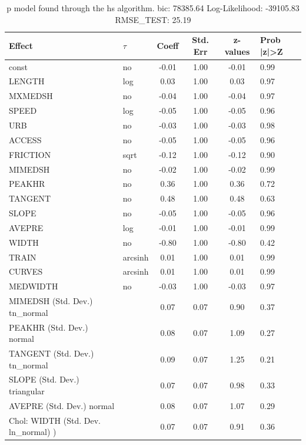 \begin{table}
	\caption{p model found through the hs algorithm. bic: 78385.64 Log-Likelihood: -39105.83 RMSE_TEST: 25.19}
	\begin{center}
		\begin{tabular}{|l|l|c|c|c|l|}
			\hline
			Effect & $\tau$ & Coeff & Std. Err & z-values & Prob |z|>Z \\
			\hline
			const & no & -0.01 & 1.00 & -0.01 & 0.99 \\
			\hline
			LENGTH & log & 0.03 & 1.00 & 0.03 & 0.97 \\
			\hline
			MXMEDSH & no & -0.04 & 1.00 & -0.04 & 0.97 \\
			\hline
			SPEED & log & -0.05 & 1.00 & -0.05 & 0.96 \\
			\hline
			URB & no & -0.03 & 1.00 & -0.03 & 0.98 \\
			\hline
			ACCESS & no & -0.05 & 1.00 & -0.05 & 0.96 \\
			\hline
			FRICTION & sqrt & -0.12 & 1.00 & -0.12 & 0.90 \\
			\hline
			MIMEDSH & no & -0.02 & 1.00 & -0.02 & 0.99 \\
			\hline
			PEAKHR & no & 0.36 & 1.00 & 0.36 & 0.72 \\
			\hline
			TANGENT & no & 0.48 & 1.00 & 0.48 & 0.63 \\
			\hline
			SLOPE & no & -0.05 & 1.00 & -0.05 & 0.96 \\
			\hline
			AVEPRE & log & -0.01 & 1.00 & -0.01 & 0.99 \\
			\hline
			WIDTH & no & -0.80 & 1.00 & -0.80 & 0.42 \\
			\hline
			TRAIN & arcsinh & 0.01 & 1.00 & 0.01 & 0.99 \\
			\hline
			CURVES & arcsinh & 0.01 & 1.00 & 0.01 & 0.99 \\
			\hline
			MEDWIDTH & no & -0.03 & 1.00 & -0.03 & 0.97 \\
			\hline
			MIMEDSH (Std. Dev.) tn_normal &  & 0.07 & 0.07 & 0.90 & 0.37 \\
			\hline
			PEAKHR (Std. Dev.) normal &  & 0.08 & 0.07 & 1.09 & 0.27 \\
			\hline
			TANGENT (Std. Dev.) tn_normal &  & 0.09 & 0.07 & 1.25 & 0.21 \\
			\hline
			SLOPE (Std. Dev.) triangular &  & 0.07 & 0.07 & 0.98 & 0.33 \\
			\hline
			AVEPRE (Std. Dev.) normal &  & 0.08 & 0.07 & 1.07 & 0.29 \\
			\hline
			 Chol: WIDTH (Std. Dev. ln_normal) ) &  & 0.07 & 0.07 & 0.91 & 0.36 \\

\end{tabular}
\end{center}
\end{table}
